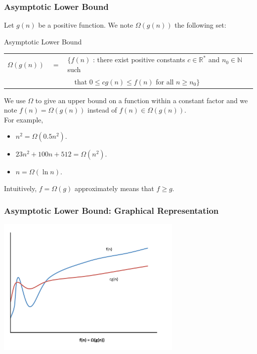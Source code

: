 \documentclass{beamer}
\begin{document}
\begin{frame}%
\frametitle{Asymptotic Lower Bound}

\scriptsize

Let $g(n)$ be a positive function. We note $\Omega(g(n))$ the following set:

\begin{block}{Asymptotic Lower Bound}
\begin{tabular}{lcl}
$\Omega(g(n))$ & $=$ & $\{ f(n)$ : there exist positive constants $c \in \mathbb{R}^*$ and $n_0 \in \mathbb{N}$ such\\
& & \ \ that $0 \le cg(n) \le f(n)$ for all $n \ge n_0 \}$\\
\end{tabular}
\end{block}
We use $\Omega$ to give an upper bound on a function within a constant factor and we
note $f(n) = \Omega(g(n))$ instead of $f(n) \in \Omega(g(n))$.\\
\vspace{0.3cm}
For example,
\begin{itemize}
\item $n^2 = \Omega(0.5n^2)$.
\item $23n^2 + 100n + 512 = \Omega(n^2)$.
\item $n = \Omega(\ln n)$.
\end{itemize}

\vspace{0.3cm}

Intuitively, $f = \Omega(g)$ approximately means that $f \ge g$.

\end{frame}

\begin{frame}[containsverbatim]
\frametitle{Asymptotic Lower Bound: Graphical Representation}

\begin{center}
\includegraphics[width=9cm]{big_omega.pdf}
\end{center}

\end{frame}
\end{document}

